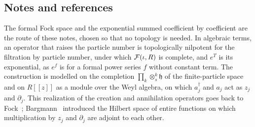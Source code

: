 \begin{vetxenv}
\subsection*{Notes and references}
The formal Fock space and the exponential summed coefficient by coefficient are the route of these notes, chosen so that no
topology is needed. In algebraic terms, an operator that raises the particle number is topologically nilpotent for the
filtration by particle number, under which $\mathcal F(\iota,R)$ is complete, and $e^T$ is its exponential, as $e^f$ is for a formal
power series $f$ without constant term. The construction is modelled on the completion $\prod_k\otimes_s^k\mathfrak h$ of the
finite-particle space and on $R[[z]]$ as a module over the Weyl algebra, on which $a_j^\dagger$ and $a_j$ act as $z_j$ and
$\partial_j$. This realization of the creation and annihilation operators goes back to Fock~\cite{fock}; Bargmann~\cite{bargmann}
introduced the Hilbert space of entire functions on which multiplication by $z_j$ and $\partial_j$ are adjoint to each other.
\end{vetxenv}

